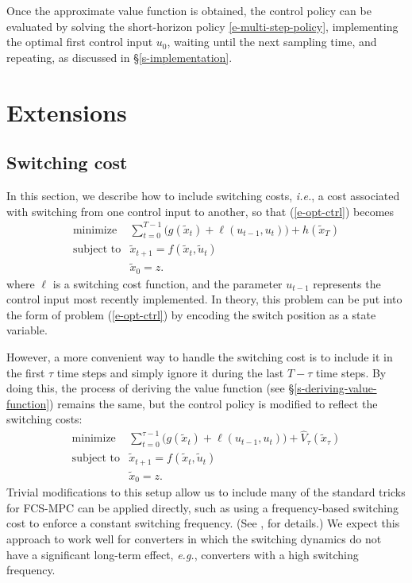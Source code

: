 \documentclass[12pt]{article}
\newcommand{\eg}{{\it e.g.}}
\newcommand{\ie}{{\it i.e.}}
\begin{document}
Once the approximate value function is obtained,
the control policy can be evaluated by solving the short-horizon policy 
\eqref{e-multi-step-policy},
implementing the optimal first control input $u_0$,
waiting until the next sampling time, and repeating,
as discussed in \S\ref{s-implementation}.




\section{Extensions}
\subsection{Switching cost}
In this section, we describe how to include switching costs,
\ie, a cost associated with switching from one control input to another,
so that (\ref{e-opt-ctrl}) becomes
\begin{equation}
\begin{array}{ll}
\mbox{minimize} & 
  \sum_{t=0}^{T - 1} \big( g(\tilde x_t) + \ell(u_{t-1}, u_t) \big)
  + h(\tilde x_{T}) \\
\mbox{subject to} & \tilde x_{t+1} = f(\tilde x_t, \tilde u_t) \\
                  & \tilde x_0 = z.
\end{array}
\label{e-opt-ctrl-switched}
\end{equation}
where $\ell$ is a switching cost function,
and the parameter $u_{t-1}$ represents the control input
most recently implemented.
In theory,
this problem
can be put into the form of problem (\ref{e-opt-ctrl})
by encoding the switch position as a state variable.


However, a more convenient way to handle the switching cost is to 
include it in the first $\tau$ time steps 
and simply ignore it during the last $T-\tau$ time steps.
By doing this, the process of deriving the value function 
(see \S\ref{s-deriving-value-function})
remains the same,
but the control policy is modified to reflect the switching costs:
\begin{equation}
\begin{array}{ll}
\mbox{minimize} & 
  \sum_{t=0}^{\tau-1} 
  \big( g(\tilde x_t) + \ell(u_{t-1}, u_t) \big) + \hat V_\tau (\tilde x_\tau) \\
\mbox{subject to} & \tilde x_{t+1} = f(\tilde x_t, \tilde u_t) \\
                  & \tilde x_0 = z.
\end{array}
\label{e-multi-step-policy-switching}
\end{equation}
Trivial modifications to this setup allow us to include
many of the standard tricks for FCS-MPC can be applied directly,
such as using a frequency-based switching cost
to enforce a constant switching frequency.
(See \cite{kouro2009model, cortes2008predictive}, for details.)
We expect this approach to work well for
converters in which the switching dynamics do not
have a significant long-term effect,
\eg, converters with a high switching frequency.
\end{document}
